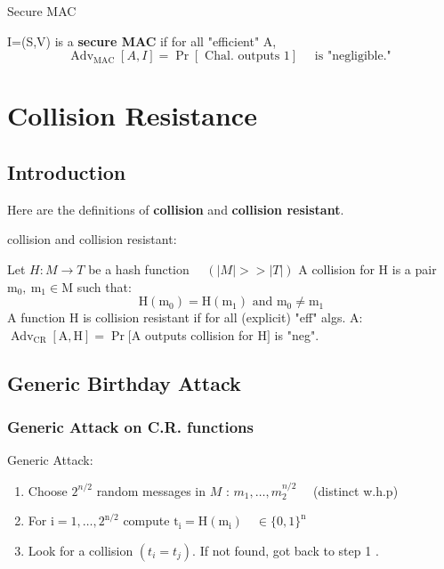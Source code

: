 \begin{definition}  Secure MAC

    I=(S,V) is a \textbf{secure MAC} if for  all "efficient" A, 
    $$
    \operatorname{Adv}_{\mathrm{MAC}}[A, I]=\operatorname{Pr}[\text { Chal. outputs } 1] \quad \text { is "negligible." }
    $$
\end{definition}


\section{Collision Resistance}

\subsection{Introduction}

Here are the definitions of \textbf{collision} and \textbf{collision resistant}.

\begin{definition}  collision and collision resistant:

    Let $H: M \rightarrow T$ be a hash function $\quad(|M|>>|T|)$
    A collision for $\mathrm{H}$ is a pair $\mathrm{m}_{0}, \mathrm{~m}_{1} \in \mathrm{M}$ such that:
    $$
    \mathrm{H}\left(\mathrm{m}_{0}\right)=\mathrm{H}\left(\mathrm{m}_{1}\right) \text { and } \mathrm{m}_{0} \neq \mathrm{m}_{1}
    $$
    A function $\mathrm{H}$ is collision resistant if for all (explicit) "eff" algs. A:
    $\operatorname{Adv}_{\mathrm{CR}}[\mathrm{A}, \mathrm{H}]=\operatorname{Pr}[\mathrm{A}$ outputs collision for $\mathrm{H}]$
    is "neg".
    
\end{definition}

\subsection{Generic Birthday Attack}

\subsubsection{Generic Attack on C.R. functions}

\begin{method}  Generic Attack:

\begin{enumerate} [itemsep=2pt,topsep=0pt,parsep=0pt]
    \item Choose $2^{n / 2}$ random messages in $M$ : $m_{1}, \ldots, m_{2}^{n / 2} \quad$ (distinct w.h.p)
    \item For $\mathrm{i}=1, \ldots, 2^{\mathrm{n} / 2}$ compute $\mathrm{t}_{\mathrm{i}}=\mathrm{H}\left(\mathrm{m}_{\mathrm{i}}\right) \quad \in\{0,1\}^{\mathrm{n}}$
    \item Look for a collision $\left(t_{i}=t_{j}\right)$. If not found, got back to step 1 .
\end{enumerate}

\end{method}

